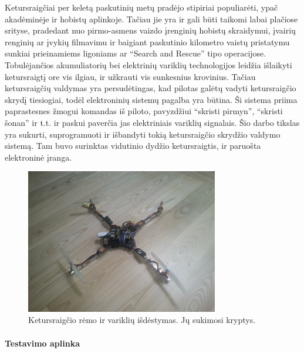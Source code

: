 \documentclass[12pt, a4paper, lithuanian, final]{article}
\begin{document}
\newpage
\tableofcontents



Ketursraigčiai per keletą paskutinių metų pradėjo stipiriai populiarėti, ypač akadėminėje ir hobistų aplinkoje.
Tačiau jie yra ir gali būti taikomi labai plačiose srityse, pradedant nuo pirmo-asmens vaizdo įrenginių hobistų skraidymui, įvairių renginių ar įvykių filmavimu ir baigiant paskutinio kilometro vaistų pristatymu sunkiai prieinamiems ligoniams ar
"`Search and Rescue"' tipo operacijose.
Tobulėjančios akumuliatorių bei elektrinių variklių technologijos leidžia išlaikyti ketursraigtį ore vis ilgiau, ir užkrauti vis sunkesnius krovinius.
Tačiau ketursraigčių valdymas yra persudėtingas, kad pilotas galėtų vadyti ketursraigčio skrydį tiesiogiai, todėl elektroninių sistemų pagalba yra būtina.
Ši sistema priima paprastesnes žmogui komandas iš piloto, pavyzdžiui "`skristi pirmyn"', "`skristi šonan"' ir t.t. ir paskui paverčia jas elektriniais variklių signalais.
Šio darbo tikslas yra sukurti, suprogramuoti ir išbandyti tokią ketursraigčio skrydžio valdymo sistemą.
Tam buvo surinktas vidutinio dydžio ketursraigtis, ir paruošta elektroninė įranga.

\begin{figure}[H]
\begin{center}
\includegraphics[width=0.75\textwidth]{img/quad.jpg}
\caption{Ketursraigčio rėmo ir variklių išdėstymas. Jų sukimosi kryptys.}
\end{center}
\end{figure}


\paragraph{Testavimo aplinka}
\end{document}
